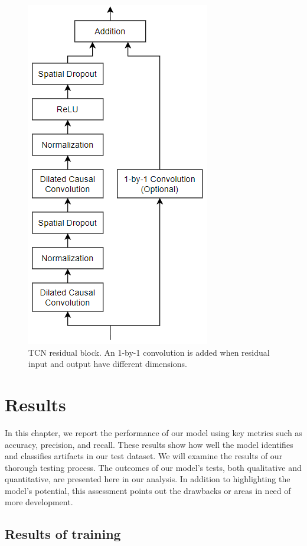 \documentclass[12pt,a4paper,titlepage,openany]{report}
\begin{document}
\begin{figure}
    \centering
    \includegraphics[width=0.5\linewidth]{images/Chapter3_Methodology/residual block.png}
    \caption{TCN residual block. An 1-by-1 convolution is added when residual input and output have different dimensions.}
    \label{fig:residual-block}
\end{figure}


\chapter{Results}
\thispagestyle{fancy}

In this chapter, we report the performance of our model using key metrics such as accuracy, precision, and recall. These results show how well the model identifies and classifies artifacts in our test dataset.
We will examine the results of our thorough testing process. The outcomes of our model's tests, both qualitative and quantitative, are presented here in our analysis. In addition to highlighting the model's potential, this assessment points out the drawbacks or areas in need of more development.

\section{Results of training}
\end{document}

